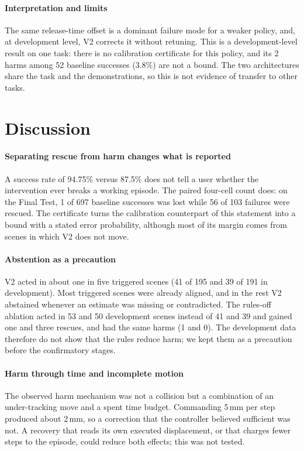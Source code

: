 \documentclass[preprint,12pt]{elsarticle}
\begin{document}
\paragraph{Interpretation and limits} The same release-time offset is a dominant failure mode for a weaker policy, and, at development level, V2 corrects it without retuning. This is a development-level result on one task: there is no calibration certificate for this policy, and its 2 harms among 52 baseline successes (3.8\%) are not a bound. The two architectures share the task and the demonstrations, so this is not evidence of transfer to other tasks.

\section{Discussion}\label{sec:discussion}

\paragraph{Separating rescue from harm changes what is reported} A success rate of 94.75\% versus 87.5\% does not tell a user whether the intervention ever breaks a working episode. The paired four-cell count does: on the Final Test, 1 of 697 baseline successes was lost while 56 of 103 failures were rescued. The certificate turns the calibration counterpart of this statement into a bound with a stated error probability, although most of its margin comes from scenes in which V2 does not move.

\paragraph{Abstention as a precaution} V2 acted in about one in five triggered scenes (41 of 195 and 39 of 191 in development). Most triggered scenes were already aligned, and in the rest V2 abstained whenever an estimate was missing or contradicted. The rules-off ablation acted in 53 and 50 development scenes instead of 41 and 39 and gained one and three rescues, and had the same harms (1 and 0). The development data therefore do not show that the rules reduce harm; we kept them as a precaution before the confirmatory stages.

\paragraph{Harm through time and incomplete motion} The observed harm mechanism was not a collision but a combination of an under-tracking move and a spent time budget. Commanding 5\,mm per step produced about 2\,mm, so a correction that the controller believed sufficient was not. A recovery that reads its own executed displacement, or that charges fewer steps to the episode, could reduce both effects; this was not tested.
\end{document}
